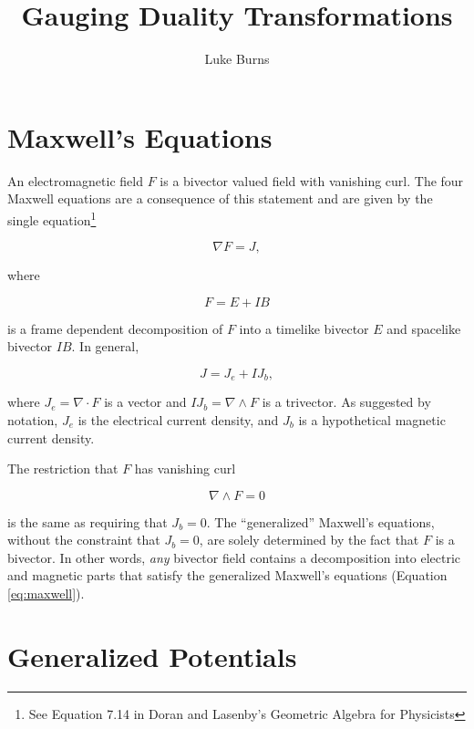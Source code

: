 \documentclass{article}
\title{Gauging Duality Transformations}
\author{Luke Burns}
\begin{document}
  \maketitle

  \section{Maxwell's Equations}

  An electromagnetic field $F$ is a bivector valued field with vanishing curl. The four Maxwell equations are a consequence of this statement and are given by the single equation\footnote{See Equation 7.14 in Doran and Lasenby's Geometric Algebra for Physicists}

  \begin{equation}
    \nabla F = J,\label{eq:maxwell}
  \end{equation}

  where 

  \begin{equation}
    F = E + I B
  \end{equation}

  is a frame dependent decomposition of $F$ into a timelike bivector $E$ and spacelike bivector $IB$. In general, 

  \begin{equation}
    J = J_e + I J_b,\label{eq:current}
  \end{equation}

  where $J_e = \nabla \cdot F$ is a vector and $I J_b = \nabla \wedge F$ is a trivector. As suggested by notation, $J_e$ is the electrical current density, and $J_b$ is a hypothetical magnetic current density.

  The restriction that $F$ has vanishing curl

  \begin{equation}
    \nabla \wedge F = 0\label{eq:constraint}
  \end{equation}

  is the same as requiring that $J_b = 0$. The ``generalized'' Maxwell's equations, without the constraint that $J_b=0$, are solely determined by the fact that $F$ is a bivector. In other words, \emph{any} bivector field contains a decomposition into electric and magnetic parts that satisfy the generalized Maxwell's equations (Equation \ref{eq:maxwell}).

  \section{Generalized Potentials}
\end{document}
